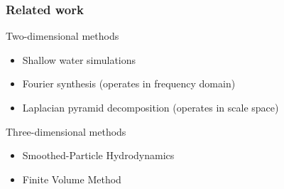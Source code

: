 \begin{frame}[<+(1)->]
\frametitle{Related work}

Two-dimensional methods

\begin{itemize}
\item Shallow water simulations
\item Fourier synthesis (operates in frequency domain)
\item Laplacian pyramid decomposition (operates in scale space)
\end{itemize}

Three-dimensional methods

\begin{itemize}
\item Smoothed-Particle Hydrodynamics
\item Finite Volume Method
\end{itemize}

\end{frame}